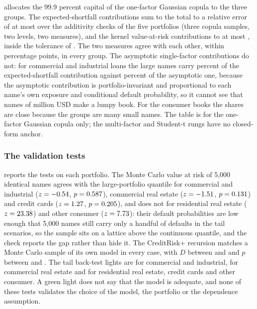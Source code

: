 

 allocates the 99.9 percent capital of the one-factor Gaussian copula to the three groups. The expected-shortfall
contributions sum to the total to a relative error of at most \ccEulerEsWorst{} over the \ccEulerRows{} additivity checks of the five
portfolios (three copula samples, two levels, two measures), and the kernel value-at-risk contributions to at most \ccEulerVarWorst{}, inside
the tolerance of \ccEulerTolVar{}. The two measures agree with each other, within \ccEulerShareGap{} percentage points, in every group. The asymptotic
single-factor contributions do not: for commercial and industrial loans the large names carry \ccEulerLargeEsCi{} percent of the expected-shortfall
contribution against \ccEulerLargeAsyCi{} percent of the asymptotic one, because the asymptotic contribution is portfolio-invariant and
proportional to each name's own exposure and conditional default probability, so it cannot see that \ccLargeNCi{} names of \ccLargeEadCi{} million
USD make a lumpy book. For the consumer
books the shares are close because the groups are many small names. The table is for the one-factor Gaussian copula only; the multi-factor
and Student-t rungs have no closed-form anchor.

\subsubsection{The validation tests}



 reports the tests on each portfolio. The Monte Carlo value at risk of 5,000 identical names agrees with the
large-portfolio quantile for commercial and industrial ($z=-0.54$, $p=0.587$), commercial real estate ($z=-1.51$, $p=0.131$)
and credit cards ($z=1.27$, $p=0.205$), and does not for residential real estate ($z=23.38$) and other consumer
($z=7.73$): their default probabilities are low enough that 5,000 names still carry only a handful of defaults in the tail scenarios, so
the sample sits on a lattice above the continuous quantile, and the check reports the gap rather than hide it. The CreditRisk+ recursion matches a
Monte Carlo sample of its own model in every case, with $D$ between \ccCrpDCre{} and \ccCrpDCi{} and $p$ between \ccCrpPCi{} and
\ccCrpPCre{}. The tail back-test lights are \ccBtLightCi{} for commercial and industrial, \ccBtLightCre{} for commercial real estate and
\ccBtLightRes{} for residential real estate, credit cards and other consumer. A green light does not say that the model is adequate, and none of
these tests validates the choice of the model, the portfolio or the dependence assumption.

